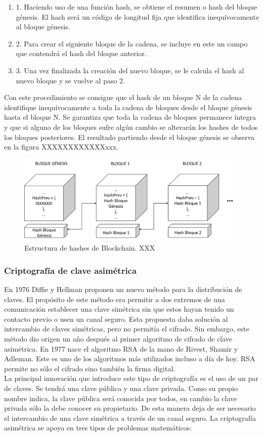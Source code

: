 \begin{enumerate}
	\item 1.	Haciendo uso de una función hash, se obtiene el resumen o hash del bloque génesis. El hash será un código de longitud fija que identifica inequívocamente al bloque génesis.
	\item 2.	Para crear el siguiente bloque de la cadena, se incluye en este un campo que contendrá el hash del bloque anterior.
	\item 3.	Una vez finalizada la creación del nuevo bloque, se le calcula el hash al nuevo bloque y se vuelve al paso 2.
\end{enumerate}

Con este procedimiento se consigue que el hash de un bloque N de la cadena identifique inequívocamente a toda la cadena de bloques desde el bloque génesis hasta el bloque N. Se garantiza que toda la cadena de bloques permanece íntegra y que si alguno de los bloques sufre algún cambio se alterarán los hashes de todos los bloques posteriores. El resultado partiendo desde el bloque génesis se observa en la figura XXXXXXXXXXXXxxx.

\begin{figure}
	\centering
	\includegraphics[width=1\textwidth]{imagenes/PrevHashes.PNG}
	\caption{\label{fig1}Estructura de hashes de Blockchain. XXX}
\end{figure}

\subsubsection{Criptografía de clave asimétrica}
En 1976 Diffie y Hellman proponen un nuevo método para la distribución de claves. El propósito de este método era permitir a dos extremos de una comunicación establecer una clave simétrica sin que estos hayan tenido un contacto previo o usen un canal seguro. Esta propuesta daba solución al intercambio de claves simétricas, pero no permitía el cifrado. Sin embargo, este método dio origen un año después al primer algoritmo de cifrado de clave asimétrica. En 1977 nace el algoritmo RSA de la mano de Rivest, Shamir y Adleman. Este es uno de los algoritmos más utilizados incluso a día de hoy. RSA permite no sólo el cifrado sino también la firma digital. \\
La principal innovación que introduce este tipo de criptografía es el uso de un par de claves. Se tendrá una clave pública y una clave privada. Como su propio nombre indica, la clave pública será conocida por todos, en cambio la clave privada sólo la debe conocer su propietario. De esta manera deja de ser necesario el intercambio de una clave simétrica a través de un canal seguro.
La criptografía asimétrica se apoya en tres tipos de problemas matemáticos:

